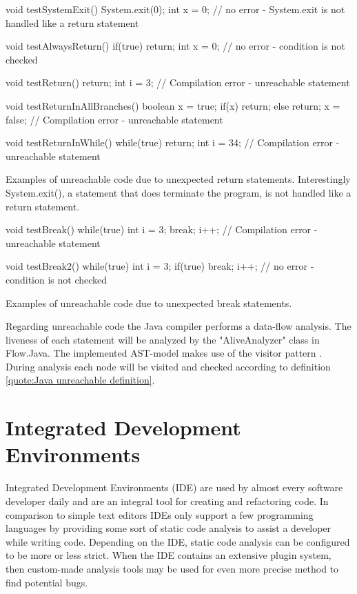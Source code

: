 \begin{program}[h!]
	\begin{JavaCode}
void testSystemExit() {
	System.exit(0);
	int x = 0; // no error - System.exit is not handled like a return statement
}

void testAlwaysReturn() {
	if(true) return;
	int x = 0; // no error - condition is not checked
}

void testReturn() {
	return;
	int i = 3; // Compilation error - unreachable statement
}

void testReturnInAllBranches() {
	boolean x = true;
	if(x) return;
	else return;
	x = false; // Compilation error - unreachable statement
}

void testReturnInWhile() {
	while(true) {
		return;
	}
	int i = 34; // Compilation error - unreachable statement
}\end{JavaCode}
	\caption{Examples of unreachable code due to unexpected return statements. Interestingly System.exit(), a statement that does terminate the program, is not handled like a return statement.}
	\label{code:Java unexpected return}
\end{program}

\begin{program}[h!]
	\begin{JavaCode}
void testBreak() {
	while(true) {
		int i = 3;
		break; 
		i++; // Compilation error - unreachable statement
	}
}

void testBreak2() {
	while(true) {
		int i = 3;
		if(true) break; 
		i++; // no error - condition is not checked
	}
}\end{JavaCode}
	\caption{Examples of unreachable code due to unexpected break statements.}
	\label{code:Java unexpected break}
\end{program}
Regarding unreachable code the Java compiler performs a data-flow analysis. The liveness of each statement will be analyzed by the "AliveAnalyzer" class in Flow.Java. The implemented AST-model makes use of the visitor pattern \cite{gammaDesignPatternsElements}. During analysis each node will be visited and checked according to definition \ref{quote:Java unreachable definition}.


\clearpage
\pagebreak
\section{Integrated Development Environments}
\label{sec:intelliJ}
Integrated Development Environments (IDE) are used by almost every software developer daily and are an integral tool for creating and refactoring code.
In comparison to simple text editors IDEs only support a few programming languages by providing some sort of static code analysis to assist a developer while writing code. 
Depending on the IDE, static code analysis can be configured to be more or less strict. 
When the IDE contains an extensive plugin system, then custom-made analysis tools may be used for even more precise method to find potential bugs.


